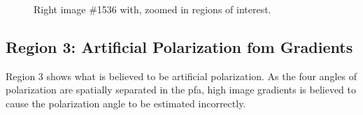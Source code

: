 \begin{figure}[H]
    \centering
    \caption{Right image \#1536 with, zoomed in regions of interest.}
    \label{fig:picture_1536}
\end{figure}

\subsection{Region 3: Artificial Polarization fom Gradients}
\label{sec:artifical_polarization}
Region 3 shows what is believed to be artificial polarization.
As the four angles of polarization are spatially separated in the \gls{pfa}, high image gradients is believed to cause the polarization angle to be estimated incorrectly.

